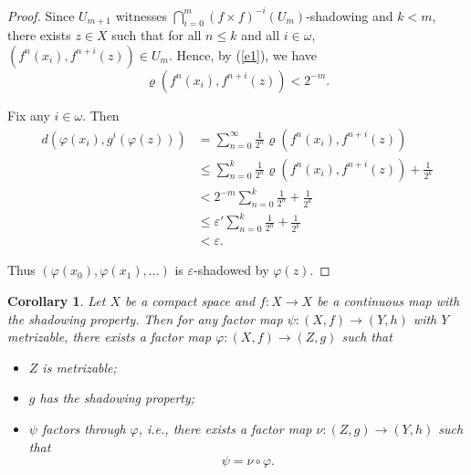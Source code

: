 \documentclass[10pt,a4paper]{amsart}
\newtheorem{corollary}[theorem]{Corollary}
\numberwithin{equation}{section}
\begin{document}
\begin{proof}
Since $ U_{m+1}$ witnesses $\bigcap_{i=0}^m (f\times f)^{-i}( U_m)$-shadowing and $k<m$, 
there exists $z\in X$ such that for all $n\le k$ and all $i\in \omega$, 
 $(f^n(x_i),f^{n+i}(z))\in U_m$. 
Hence, by (\ref{e1}), we have
\[
\varrho(f^n(x_i),f^{n+i}(z))<2^{-m}.
\]

Fix any $i\in \omega$. Then
\[
\begin{aligned}
d(\varphi(x_i),g^i(\varphi(z)))
&=\sum_{n=0}^\infty \frac{1}{2^n}\varrho(f^n(x_i),f^{n+i}(z))\\
&\le \sum_{n=0}^k \frac{1}{2^n}\varrho(f^n(x_i),f^{n+i}(z)) + \frac{1}{2^k}\\
&< 2^{-m}\sum_{n=0}^k \frac{1}{2^n} + \frac{1}{2^k}\\
&\leq \varepsilon'\sum_{n=0}^k \frac{1}{2^n} + \frac{1}{2^k}\\
&< \varepsilon.
\end{aligned}
\]

Thus $(\varphi(x_0),\varphi(x_1),\ldots)$ is $\varepsilon$-shadowed by $\varphi(z)$.
\end{proof}

\begin{corollary}\label{Coro:shafac}
Let $X$ be a compact space and $f: X\to X$ be a continuous map with the shadowing property. 
Then for any factor map $\psi:(X,f)\to (Y,h)$ with $Y$ metrizable, there exists a factor map $\varphi:(X,f)\to (Z,g)$ such that
\begin{itemize}
\item[(i)] $Z$ is metrizable;
\item[(ii)] $g$ has the shadowing property;
\item[(iii)] $\psi$ factors through $\varphi$, i.e., there exists a factor map $\nu:(Z,g)\to (Y,h)$ such that
\[
\psi=\nu\circ \varphi.
\]
\end{itemize}
\end{corollary}
\end{document}
